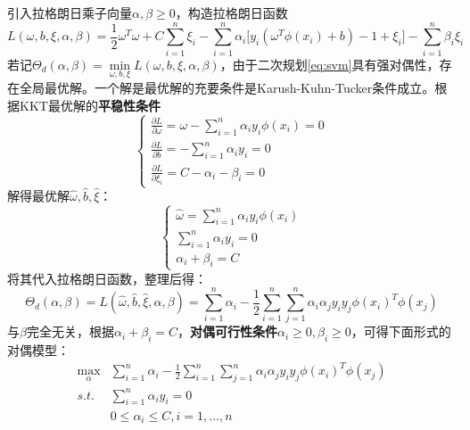 引入拉格朗日乘子向量$\alpha,\beta \ge 0$，构造拉格朗日函数
\begin{equation}
    L(\omega,b,\xi,\alpha,\beta) = \frac{1}{2} \omega^T \omega + C\sum\limits_{i=1}^n\xi_i - \sum\limits_{i=1}^n \alpha_i \big[y_i(\omega^T\phi(x_i) + b) - 1 + \xi_i\big] - \sum\limits_{i=1}^n \beta_i \xi_i
\end{equation}
若记$\Theta_d(\alpha,\beta) = \min\limits_{\omega,b,\xi} L(\omega,b,\xi,\alpha,\beta)$，由于二次规划\eqref{eq:svm}具有强对偶性，存在全局最优解。一个解是最优解的充要条件是Karush-Kuhn-Tucker条件成立。根据KKT最优解的\textbf{平稳性条件}
\begin{equation}
    \left\{
    \begin{array}{l}
      \frac{\partial L}{\partial \omega} = \omega - \sum\limits_{i=1}^n \alpha_i y_i \phi(x_i) = 0 \\
      \frac{\partial L}{\partial b} = - \sum\limits_{i=1}^n \alpha_i y_i = 0 \\
      \frac{\partial L}{\partial \xi_i}  = C - \alpha_i - \beta_i = 0
    \end{array}
    \right.
\end{equation}
解得最优解$\hat \omega,\hat b,\hat \xi$：
\begin{equation}
    \left\{
    \begin{array}{l}
      \hat \omega = \sum\limits_{i=1}^n \alpha_i y_i \phi(x_i) \\
      \sum\limits_{i=1}^n \alpha_i y_i = 0 \\
      \alpha_i + \beta_i = C
    \end{array}
    \right.
\end{equation}
将其代入拉格朗日函数，整理后得：
\begin{equation}
    \Theta_d(\alpha,\beta) = L(\hat \omega,\hat b,\hat \xi,\alpha,\beta) = \sum\limits_{i=1}^n \alpha_i - \frac{1}{2} \sum\limits_{i=1}^n\sum\limits_{j=1}^n \alpha_i \alpha_j y_i y_j \phi(x_i)^T \phi(x_j)
\end{equation}
与$\beta$完全无关，根据$\alpha_i + \beta_i = C$，\textbf{对偶可行性条件}$\alpha_i\ge 0,\beta_i\ge 0$，可得下面形式的对偶模型：
\begin{equation}\label{eq:dualsvm}
    \begin{array}{ll}
      \max\limits_\alpha & \sum\limits_{i=1}^n \alpha_i - \frac{1}{2} \sum\limits_{i=1}^n \sum\limits_{j=1}^n \alpha_i \alpha_j y_i y_j \phi(x_i)^T \phi(x_j) \\
      \textit{s.t.} & \sum\limits_{i=1}^n \alpha_i y_i = 0 \\
      & 0\le \alpha_i \le C ,i = 1,\ldots,n
    \end{array}
\end{equation}
